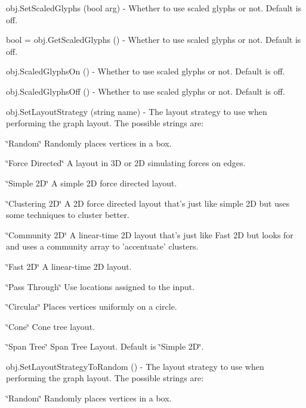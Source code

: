 \begin{DoxyItemize}
\item {\ttfamily obj.\-Set\-Scaled\-Glyphs (bool arg)} -\/ Whether to use scaled glyphs or not. Default is off.  
\item {\ttfamily bool = obj.\-Get\-Scaled\-Glyphs ()} -\/ Whether to use scaled glyphs or not. Default is off.  
\item {\ttfamily obj.\-Scaled\-Glyphs\-On ()} -\/ Whether to use scaled glyphs or not. Default is off.  
\item {\ttfamily obj.\-Scaled\-Glyphs\-Off ()} -\/ Whether to use scaled glyphs or not. Default is off.  
\item {\ttfamily obj.\-Set\-Layout\-Strategy (string name)} -\/ The layout strategy to use when performing the graph layout. The possible strings are\-:
\begin{DoxyItemize}
\item \char`\"{}\-Random\char`\"{} Randomly places vertices in a box.
\item \char`\"{}\-Force Directed\char`\"{} A layout in 3\-D or 2\-D simulating forces on edges.
\item \char`\"{}\-Simple 2\-D\char`\"{} A simple 2\-D force directed layout.
\item \char`\"{}\-Clustering 2\-D\char`\"{} A 2\-D force directed layout that's just like simple 2\-D but uses some techniques to cluster better.
\item \char`\"{}\-Community 2\-D\char`\"{} A linear-\/time 2\-D layout that's just like Fast 2\-D but looks for and uses a community array to 'accentuate' clusters.
\item \char`\"{}\-Fast 2\-D\char`\"{} A linear-\/time 2\-D layout.
\item \char`\"{}\-Pass Through\char`\"{} Use locations assigned to the input.
\item \char`\"{}\-Circular\char`\"{} Places vertices uniformly on a circle.
\item \char`\"{}\-Cone\char`\"{} Cone tree layout.
\item \char`\"{}\-Span Tree\char`\"{} Span Tree Layout. Default is \char`\"{}\-Simple 2\-D\char`\"{}.  
\end{DoxyItemize}
\item {\ttfamily obj.\-Set\-Layout\-Strategy\-To\-Random ()} -\/ The layout strategy to use when performing the graph layout. The possible strings are\-:
\begin{DoxyItemize}
\item \char`\"{}\-Random\char`\"{} Randomly places vertices in a box.

\end{DoxyItemize}
\end{DoxyItemize}

